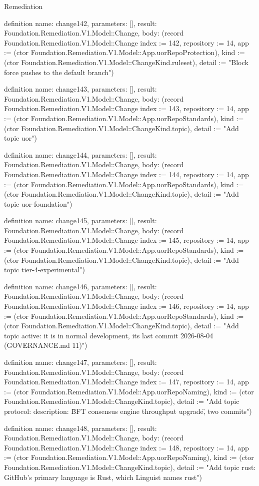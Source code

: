 \begin{lexlean}{Remediation}
\begin{semanticmodule}
definition{
  name: change142,
  parameters: [],
  result: Foundation.Remediation.V1.Model::Change,
  body: (record Foundation.Remediation.V1.Model::Change {index := 142, repository := 14, app := (ctor Foundation.Remediation.V1.Model::App.uorRepoProtection), kind := (ctor Foundation.Remediation.V1.Model::ChangeKind.ruleset), detail := "Block force pushes to the default branch"})
}

definition{
  name: change143,
  parameters: [],
  result: Foundation.Remediation.V1.Model::Change,
  body: (record Foundation.Remediation.V1.Model::Change {index := 143, repository := 14, app := (ctor Foundation.Remediation.V1.Model::App.uorRepoStandards), kind := (ctor Foundation.Remediation.V1.Model::ChangeKind.topic), detail := "Add topic uor"})
}

definition{
  name: change144,
  parameters: [],
  result: Foundation.Remediation.V1.Model::Change,
  body: (record Foundation.Remediation.V1.Model::Change {index := 144, repository := 14, app := (ctor Foundation.Remediation.V1.Model::App.uorRepoStandards), kind := (ctor Foundation.Remediation.V1.Model::ChangeKind.topic), detail := "Add topic uor-foundation"})
}

definition{
  name: change145,
  parameters: [],
  result: Foundation.Remediation.V1.Model::Change,
  body: (record Foundation.Remediation.V1.Model::Change {index := 145, repository := 14, app := (ctor Foundation.Remediation.V1.Model::App.uorRepoStandards), kind := (ctor Foundation.Remediation.V1.Model::ChangeKind.topic), detail := "Add topic tier-4-experimental"})
}

definition{
  name: change146,
  parameters: [],
  result: Foundation.Remediation.V1.Model::Change,
  body: (record Foundation.Remediation.V1.Model::Change {index := 146, repository := 14, app := (ctor Foundation.Remediation.V1.Model::App.uorRepoStandards), kind := (ctor Foundation.Remediation.V1.Model::ChangeKind.topic), detail := "Add topic active: it is in normal development, its last commit 2026-08-04 (GOVERNANCE.md 11)"})
}

definition{
  name: change147,
  parameters: [],
  result: Foundation.Remediation.V1.Model::Change,
  body: (record Foundation.Remediation.V1.Model::Change {index := 147, repository := 14, app := (ctor Foundation.Remediation.V1.Model::App.uorRepoNaming), kind := (ctor Foundation.Remediation.V1.Model::ChangeKind.topic), detail := "Add topic protocol: description: \"BFT consensus engine throughput upgrade\", two commits"})
}

definition{
  name: change148,
  parameters: [],
  result: Foundation.Remediation.V1.Model::Change,
  body: (record Foundation.Remediation.V1.Model::Change {index := 148, repository := 14, app := (ctor Foundation.Remediation.V1.Model::App.uorRepoNaming), kind := (ctor Foundation.Remediation.V1.Model::ChangeKind.topic), detail := "Add topic rust: GitHub's primary language is Rust, which Linguist names rust"})
}


\end{semanticmodule}
\end{lexlean}
